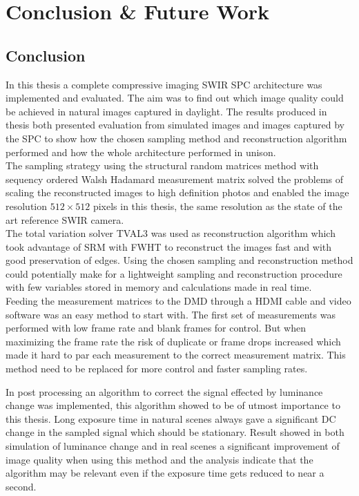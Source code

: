 \section{Conclusion \& Future Work}
\label{sec:conclusions_and_fw}
\subsection{Conclusion}
\label{sec:conclusion}

In this thesis a complete compressive imaging SWIR SPC architecture was implemented and evaluated. The aim was to find out which image quality could be achieved in natural images captured in daylight. The results produced in thesis both presented evaluation from simulated images and images captured by the SPC to show how the chosen sampling method and reconstruction algorithm performed and how the whole architecture performed in unison.\\[0.1in]

The sampling strategy using the structural random matrices method with sequency ordered Walsh Hadamard measurement matrix solved the problems of scaling the reconstructed images to high definition photos and enabled the image resolution $512 \times 512$ pixels in this thesis, the same resolution as the state of the art reference SWIR camera.\\[0.1in]

The total variation solver TVAL3 was used as reconstruction algorithm  which took advantage of SRM with FWHT to reconstruct the images fast and with good preservation of edges. Using the chosen sampling and reconstruction method could potentially make for a lightweight sampling and reconstruction procedure with few variables stored in memory and calculations made in real time.\\[0.1in]

Feeding the measurement matrices to the DMD through a HDMI cable and video software was an easy method to start with. The first set of measurements was performed with low frame rate and blank frames for control. But when maximizing the frame rate the risk of duplicate or frame drops increased which made it hard to par each measurement to the correct measurement matrix. This method need to be replaced for more control and faster sampling rates.

In post processing an algorithm to correct the signal effected by luminance change was implemented, this algorithm showed to be of utmost importance to this thesis. Long exposure time in natural scenes always gave a significant DC change in the sampled signal which should be stationary. Result showed in both simulation of luminance change and in real scenes a significant improvement of image quality when using this method and the analysis indicate that the algorithm may be relevant even if the exposure time gets reduced to near a second.\\[0.1in]

